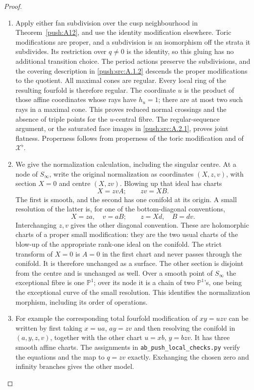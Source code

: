 \begin{proof}
\begin{enumerate}[label=\arabic*.,leftmargin=*]
\item Apply either fan subdivision over the cusp neighbourhood in
Theorem~\ref{push:A12}, and use the identity modification elsewhere.
Toric modifications are proper, and a subdivision is an
isomorphism off the strata it subdivides. Its restriction over
$q\ne0$ is the identity, so this gluing has no additional
transition choice. The period actions preserve the subdivisions,
and the covering description in \ref{push:src:A.1.2} descends the proper
modifications to the quotient. All maximal cones are regular.
Every local ring of the resulting fourfold is therefore regular.
The coordinate $u$ is the product of those affine coordinates
whose rays have $h_u=1$; there are at most two such rays in a
maximal cone. This proves reduced normal crossings and the absence
of triple points for the $u$-central fibre. The regular-sequence
argument, or the saturated face images in \ref{push:src:A.2.1}, proves joint
flatness. Properness follows from properness of the toric
modification and of $\mathcal X^\flat$.

\item We give the normalization calculation, including the singular
centre. At a node of $S_\infty$, write the original normalization
as coordinates $(X,z,v)$, with section $X=0$ and centre
$(X,zv)$. Blowing up that ideal has charts
\[
 X=zvA;\qquad zv=XB.
\]
The first is smooth, and the second has one conifold at its
origin. A small resolution of the latter is, for one of the
bottom-diagonal conventions,
\[
 X=za,\quad v=aB;\qquad z=Xd,\quad B=dv.
\]
Interchanging $z,v$ gives the other diagonal convention. These
are holomorphic charts of a proper small modification: they are
the two usual charts of the blow-up of the appropriate rank-one
ideal on the conifold. The strict transform of $X=0$ is $A=0$
in the first chart and never passes through the conifold. It is
therefore unchanged as a surface. The other section is disjoint
from the centre and is unchanged as well. Over a smooth point
of $S_\infty$ the exceptional fibre is one $\mathbb P^1$;
over its node it is a chain of two $\mathbb P^1$'s, one being
the exceptional curve of the small resolution. This identifies
the normalization morphism, including its order of operations.

\item For example the corresponding total fourfold modification of
$xy=uzv$ can be written by first taking $x=ua$, $ay=zv$ and
then resolving the conifold in $(a,y,z,v)$, together with the
other chart $u=xb$, $y=bzv$. It has three smooth affine charts.
The assignments in \texttt{ab\_push\_local\_checks.py} verify
the equations and the map to $q=zv$ exactly. Exchanging the
chosen zero and infinity branches gives the other model.


\end{enumerate}
\end{proof}
